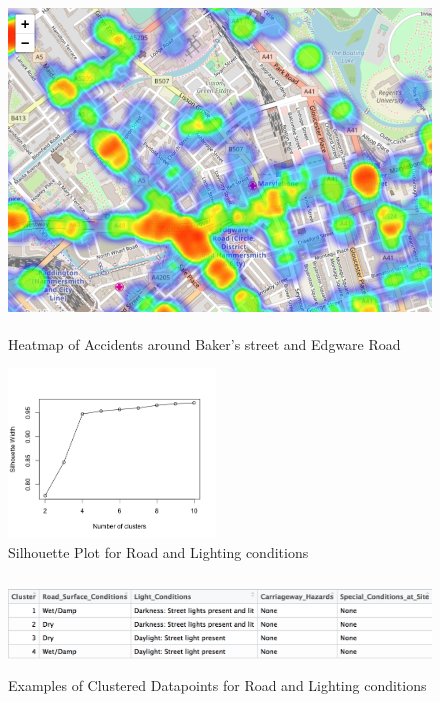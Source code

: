 \documentclass[a4paper, 11pt]{article}
\begin{document}
\begin{figure}[H]
    \begin{center}
      \includegraphics[height=9cm, width=25cm,keepaspectratio]{accident-2009-heatmap-bakers-street.png}
      \caption{Heatmap of Accidents around Baker's street and Edgware Road}
    \end{center}
\end{figure}

\begin{figure}[H]
    \begin{center}
      \includegraphics[height=4.5cm, scale=0.4,keepaspectratio]{silhouette_road_conditions.png}
      \caption{Silhouette Plot for Road and Lighting conditions}
    \end{center}
\end{figure}


\begin{figure}[H]
    \begin{center}
      \includegraphics[height=2.5cm,keepaspectratio]{cluster_eg.png}
      \caption{Examples of Clustered Datapoints for Road and Lighting conditions}
    \end{center}
\end{figure}
\end{document}
